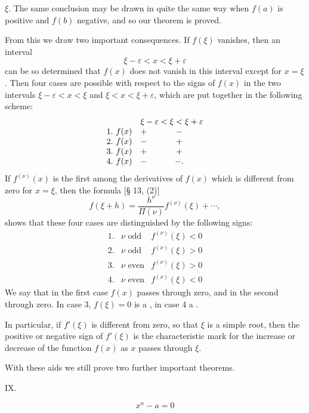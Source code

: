 
$\xi$. The same conclusion may be drawn in quite the same way when $f(a)$ is positive and $f(b)$ negative, and so our theorem is proved.

From this we draw two important consequences. If $f(\xi)$ vanishes, then an interval
\[
 \xi-\varepsilon<x<\xi+\varepsilon
\]
can be so determined that $f(x)$ does not vanish in this interval except for $x=\xi$. Then four cases are possible with respect to the signs of $f(x)$ in the two intervals $\xi-\varepsilon<x<\xi$ and $\xi<x<\xi+\varepsilon$, which are put together in the following scheme:
\[
\begin{array}{lcc}
&\multicolumn{2}{c}{\xi-\varepsilon<\xi<\xi+\varepsilon}\\
1.\ f(x)&+&-\\
2.\ f(x)&-&+\\
3.\ f(x)&+&+\\
4.\ f(x)&-&-.
\end{array}
\]
If $f^{(\nu)}(x)$ is the first among the derivatives of $f(x)$ which is different from zero for $x=\xi$, then the formula [§ 13, (2)]
\[
 f(\xi+h)=\frac{h^\nu}{\Pi(\nu)}f^{(\nu)}(\xi)+\cdots,
\]
shows that these four cases are distinguished by the following signs:
\[
\begin{array}{lll}
1.&\nu\text{ odd}& f^{(\nu)}(\xi)<0\\
2.&\nu\text{ odd}& f^{(\nu)}(\xi)>0\\
3.&\nu\text{ even}& f^{(\nu)}(\xi)>0\\
4.&\nu\text{ even}& f^{(\nu)}(\xi)<0
\end{array}
\]
We say that in the first case $f(x)$ passes  through zero, and in the second  through zero. In case 3, $f(\xi)=0$ is a , in case 4 a .

In particular, if $f'(\xi)$ is different from zero, so that $\xi$ is a simple root, then the positive or negative sign of $f'(\xi)$ is the characteristic mark for the increase or decrease of the function $f(x)$ as $x$ passes through $\xi$.

With these aids we still prove two further important theorems.

\medskip
\noindent IX. \par
\[
 x^n-a=0
\]
\par
\medskip
